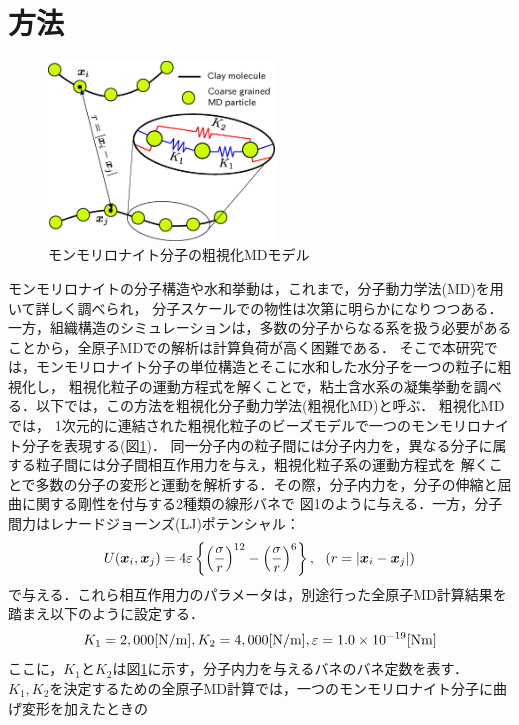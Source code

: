 ﻿\documentclass[11pt,a4j]{jarticle}
\begin{document}
\section{方法}
\begin{figure}
	\centering
	\includegraphics[keepaspectratio,width=60mm]{Figs/cg_model.eps}
	\caption{モンモリロナイト分子の粗視化MDモデル}
	\label{fig:fig1}
\end{figure}
モンモリロナイトの分子構造や水和挙動は，これまで，分子動力学法(MD)を用いて詳しく調べられ，
分子スケールでの物性は次第に明らかになりつつある\cite{Kawamura}．
一方，組織構造のシミュレーションは，多数の分子からなる系を扱う必要があることから，全原子MDでの解析は計算負荷が高く困難である．
そこで本研究では，モンモリロナイト分子の単位構造とそこに水和した水分子を一つの粒子に粗視化し，
粗視化粒子の運動方程式を解くことで，粘土含水系の凝集挙動を調べる．以下では，この方法を粗視化分子動力学法(粗視化MD)と呼ぶ．
粗視化MDでは， 1次元的に連結された粗視化粒子のビーズモデルで一つのモンモリロナイト分子を表現する(図\ref{fig:fig1})．
同一分子内の粒子間には分子内力を，異なる分子に属する粒子間には分子間相互作用力を与え，粗視化粒子系の運動方程式を
解くことで多数の分子の変形と運動を解析する．その際，分子内力を，分子の伸縮と屈曲に関する剛性を付与する2種類の線形バネで
図1のように与える．一方，分子間力はレナードジョーンズ(LJ)ポテンシャル：
\begin{equation}
	U(\mbox{\boldmath $x$}_i,\mbox{\boldmath $x$}_j)=4\varepsilon
	\left\{ \left(\frac{\sigma}{r}\right)^{12}-
	\left( \frac{\sigma}{r}\right)^6\right\}, 
	\ \ \left(r=\left| \mbox{\boldmath $x$}_i-\mbox{\boldmath $x$}_j\right|\right)
	\label{eqn:LJ}
\end{equation}
で与える．これら相互作用力のパラメータは，別途行った全原子MD計算結果を踏まえ以下のように設定する．
\begin{equation}
	K_1  = 2,000[{\rm N / m}],   K_2  = 4,000[{\rm N / m}],  \varepsilon = 1.0\times10^{-19}     [{\rm Nm}]
	\label{eqn:prms}
\end{equation}
ここに，$K_1$と$K_2$は図\ref{fig:fig1}に示す，分子内力を与えるバネのバネ定数を表す．
$K_1,K_2$を決定するための全原子MD計算では，一つのモンモリロナイト分子に曲げ変形を加えたときの
\end{document}

